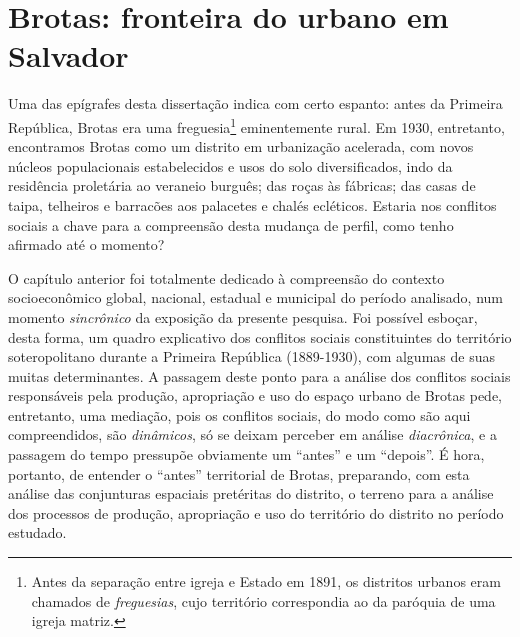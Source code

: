 \chapter{Brotas: fronteira do urbano em Salvador}\label{cap:2}

Uma das epígrafes desta dissertação indica com certo espanto: antes da Primeira República, Brotas era uma freguesia\footnote{Antes da separação entre igreja e Estado em 1891, os distritos urbanos eram chamados de \textit{freguesias}, cujo território correspondia ao da paróquia de uma igreja matriz.} eminentemente rural. Em 1930, entretanto, encontramos Brotas como um distrito em urbanização acelerada, com novos núcleos populacionais estabelecidos e usos do solo diversificados, indo da residência proletária ao veraneio burguês; das roças às fábricas; das casas de taipa, telheiros e barracões aos palacetes e chalés ecléticos. Estaria nos conflitos sociais a chave para a compreensão desta mudança de perfil, como tenho afirmado até o momento?

O capítulo anterior foi totalmente dedicado à compreensão do contexto socioeconômico global, nacional, estadual e municipal do período analisado, num momento \textit{sincrônico} da exposição da presente pesquisa. Foi possível esboçar, desta forma, um quadro explicativo dos conflitos sociais constituintes do território soteropolitano durante a Primeira República (1889-1930), com algumas de suas muitas determinantes. A passagem deste ponto para a análise dos conflitos sociais responsáveis pela produção, apropriação e uso do espaço urbano de Brotas pede, entretanto, uma mediação, pois os conflitos sociais, do modo como são aqui compreendidos, são \textit{dinâmicos}, só se deixam perceber em análise \textit{diacrônica}, e a passagem do tempo pressupõe obviamente um ``antes'' e um ``depois''. É hora, portanto, de entender o ``antes'' territorial de Brotas, preparando, com esta análise das conjunturas espaciais pretéritas do distrito, o terreno para a análise dos processos de produção, apropriação e uso do território do distrito no período estudado. 

